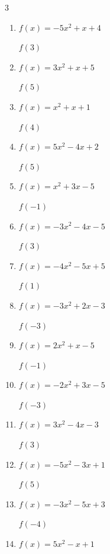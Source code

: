 \begin{multicols}{3}
\begin{enumerate}
$f(3)$
        \phantom{$= 1$}

  \item $f(x)=-5x^{2}+x+4$

$f(3)$
        \phantom{$= -38$}

  \item $f(x)=3x^{2}+x+5$

$f(5)$
        \phantom{$= 85$}

  \item $f(x)=x^{2}+x+1$

$f(4)$
        \phantom{$= 21$}

  \item $f(x)=5x^{2}-4x+2$

$f(5)$
        \phantom{$= 107$}

  \item $f(x)=x^{2}+3x-5$

$f(-1)$
        \phantom{$= -7$}

  \item $f(x)=-3x^{2}-4x-5$

$f(3)$
        \phantom{$= -44$}

  \item $f(x)=-4x^{2}-5x+5$

$f(1)$
        \phantom{$= -4$}

  \item $f(x)=-3x^{2}+2x-3$

$f(-3)$
        \phantom{$= -36$}

  \item $f(x)=2x^{2}+x-5$

$f(-1)$
        \phantom{$= -4$}

  \item $f(x)=-2x^{2}+3x-5$

$f(-3)$
        \phantom{$= -32$}

  \item $f(x)=3x^{2}-4x-3$

$f(3)$
        \phantom{$= 12$}

  \item $f(x)=-5x^{2}-3x+1$

$f(5)$
        \phantom{$= -139$}

\columnbreak %

  \item $f(x)=-3x^{2}-5x+3$

$f(-4)$
        \phantom{$= -25$}

  \item $f(x)=5x^{2}-x+1$


\end{enumerate}
\end{multicols}
